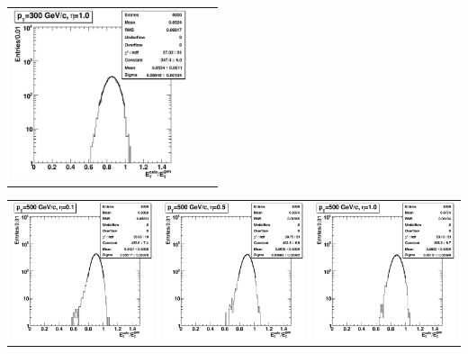 \documentclass{cmspaper}
\begin{document}
\begin{appendices}
\begin{center}
\begin{tabular}{lll}
 \includegraphics[width=2in]{figs/h_ETRatio_ET_py_fit_corr_eta1.0_pT300.eps} \\
\end{tabular}
\end{center}
\begin{center}
\begin{tabular}{lll}
 \includegraphics[width=2in]{figs/h_ETRatio_ET_py_fit_corr_eta0.1_pT500.eps} &
 \includegraphics[width=2in]{figs/h_ETRatio_ET_py_fit_corr_eta0.5_pT500.eps} &
 \includegraphics[width=2in]{figs/h_ETRatio_ET_py_fit_corr_eta1.0_pT500.eps} \\

\end{tabular}
\end{center}
\end{appendices}
\end{document}
